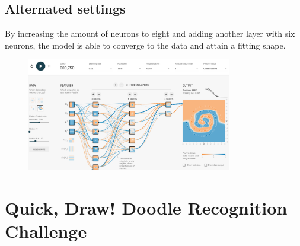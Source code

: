 \documentclass{article}
\begin{document}
\subsection{Alternated settings}
By increasing the amount of neurons to eight and adding another layer with six neurons, the model is able to converge to the data and attain a fitting shape.

\begin{figure}[h]
  \centering
  \includegraphics[width=0.8\textwidth]{alternated_spiral.png}
\end{figure}


\section{Quick, Draw! Doodle Recognition Challenge}
\end{document}
